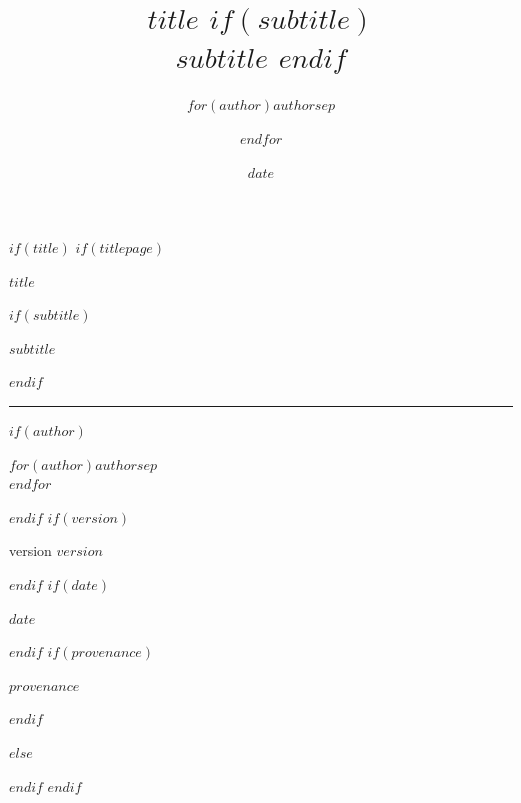 \documentclass[10pt]{article}
\title{
  \vspace{-2em}
  \color{AccentPrimary}\Huge\bfseries
  $title$
  $if(subtitle)$
  \\
  \vspace{0.5em}
  \Large\color{TextSecondary}
  $subtitle$
  $endif$
}
\author{
  \large\color{TextPrimary}
  $for(author)$$author$$sep$ \and $endfor$
}
\date{\color{TextSecondary}$date$}
\date{}
\begin{document}
%
%
$if(title)$
$if(titlepage)$
\begin{titlepage}
\thispagestyle{empty}
\raggedright
{\color{AccentPrimary}\fontsize{34}{40}\selectfont\bfseries $title$\par}
$if(subtitle)$
\vspace{1.2em}
{\color{TextSecondary}\LARGE $subtitle$\par}
$endif$
\vspace{1.8em}
{\color{AccentPrimary}\rule{0.28\textwidth}{1.2pt}\par}
\vspace{1.8em}
$if(author)$
{\color{TextPrimary}\large $for(author)$$author$$sep$\\$endfor$\par}
$endif$
$if(version)$
\vspace{0.5em}
{\color{TextSecondary}\large version $version$\par}
$endif$
$if(date)$
\vspace{0.35em}
{\color{TextSecondary}\large $date$\par}
$endif$
$if(provenance)$
{\color{TextSecondary}\footnotesize\ttfamily $provenance$\par}
$endif$
\end{titlepage}
\clearpage
$else$
\maketitle
\thispagestyle{fancy}
$endif$
$endif$
\end{document}
